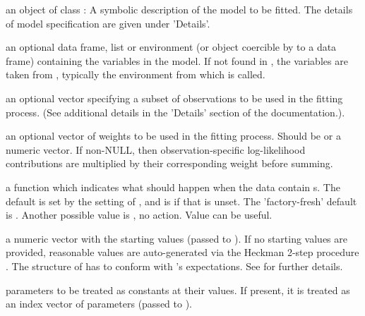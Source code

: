 \documentclass[letterpaper]{book}
\begin{document}
\begin{Arguments}
\begin{ldescription}
\item[\code{formula}] an object of class : A symbolic description
of the model to be fitted. The details of model specification are given under
'Details'.

\item[\code{data}] an optional data frame, list or environment (or object coercible by
 to a data frame) containing the variables in the model. If
not found in , the variables are taken from ,
typically the environment from which  is called.

\item[\code{subset}] an optional vector specifying a subset of observations to be used
in the fitting process. (See additional details in the 'Details' section of
the  documentation.).

\item[\code{weights}] an optional vector of weights to be used in the fitting process.
Should be  or a numeric vector. If non-NULL, then observation-specific
log-likelihood contributions are multiplied by their corresponding weight
before summing.

\item[\code{na.action}] a function which indicates what should happen when the data
contain s. The default is set by the  setting of ,
and is  if that is unset. The 'factory-fresh' default is .
Another possible value is , no action. Value  can be useful.

\item[\code{start}] a numeric vector with the starting values (passed to ).
If no starting values are provided, reasonable values are auto-generated via
the Heckman 2-step procedure . The structure of  has to
conform with 's expectations. See  for further details.

\item[\code{fixed}] parameters to be treated as constants at their  values. If
present, it is treated as an index vector of  parameters (passed to
).


\end{ldescription}
\end{Arguments}
\end{document}
